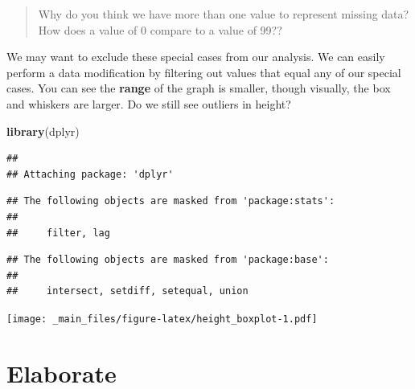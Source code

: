 \documentclass[
]{book}
\newenvironment{Shaded}{\begin{snugshade}}{\end{snugshade}}
\newcommand{\DecValTok}[1]{\textcolor[rgb]{0.00,0.00,0.81}{#1}}
\newcommand{\FunctionTok}[1]{\textcolor[rgb]{0.13,0.29,0.53}{\textbf{#1}}}
\newcommand{\NormalTok}[1]{#1}
\newcommand{\OtherTok}[1]{\textcolor[rgb]{0.56,0.35,0.01}{#1}}
\newcommand{\SpecialCharTok}[1]{\textcolor[rgb]{0.81,0.36,0.00}{\textbf{#1}}}
\begin{document}
\begin{quote}
Why do you think we have more than one value to represent missing data? How does a value of 0 compare to a value of 99??
\end{quote}

We may want to exclude these special cases from our analysis. We can easily perform a data modification by filtering out values that equal any of our special cases. You can see the \textbf{range} of the graph is smaller, though visually, the box and whiskers are larger. Do we still see outliers in height?

\begin{Shaded}
\begin{Highlighting}[]
\FunctionTok{library}\NormalTok{(dplyr)}
\end{Highlighting}
\end{Shaded}

\begin{verbatim}
## 
## Attaching package: 'dplyr'
\end{verbatim}

\begin{verbatim}
## The following objects are masked from 'package:stats':
## 
##     filter, lag
\end{verbatim}

\begin{verbatim}
## The following objects are masked from 'package:base':
## 
##     intersect, setdiff, setequal, union
\end{verbatim}

\begin{Shaded}
\end{Shaded}

\texttt{[image: \_main\_files/figure-latex/height\_boxplot-1.pdf]}

\hypertarget{elaborate}{%
\section{Elaborate}\label{elaborate}}
\end{document}
